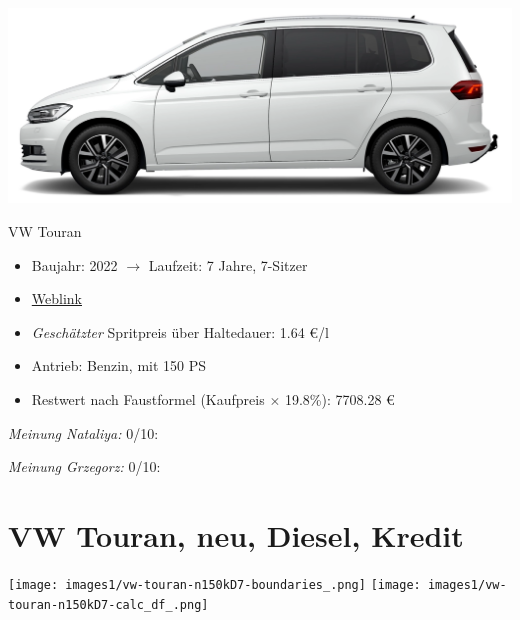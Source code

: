 \documentclass[landscape, DIV=99, 14pt]{scrartcl}
\begin{document}
\pagebreak
\begin{center}
\includegraphics[width=0.9\columnwidth]{cars/vw-touran-neu-benzin.png}

VW Touran
\end{center}

\begin{itemize}
    \item Baujahr: 2022 $\rightarrow$ Laufzeit: 7 Jahre, 7-Sitzer
    \item \href{https://www.volkswagen.de/de/konfigurator.html/__app/touran/touran/highline.app?buildabilityStatus-app=buildable&category-app=private&carlineId-app=31000&salesGroupId-app=32600&trimName-app=Highline&modelId-app=5T14PZ%24GYORYOR&modelVersion-app=2&modelYear-app=2022&exteriorId-app=F14+0Q0Q&interiorId-app=F56+++++BG&options-app=GWBGWBG-GPG3PG3-MAHV1M6-GPF9PF9-GRBDRBD-MKSUKA1-MSSH4KF-GP19P19-MVTV9IJ-GWQ1WQ1}{Weblink}
    \item \emph{Gesch\"atzter} Spritpreis \"uber Haltedauer: 1.64 \euro{}/l
    \item Antrieb: Benzin, mit 150 PS
    \item Restwert nach Faustformel (Kaufpreis $\times$ 19.8\%): 7708.28 \euro{}
\end{itemize}

\begin{small}
\emph{Meinung Nataliya:} 0/10: 
        
\emph{Meinung Grzegorz:} 0/10: 
\end{small}

\pagebreak


\twocolumn

\section*{VW Touran, neu, Diesel, Kredit}
\begin{center}
\texttt{[image: images1/vw-touran-n150kD7-boundaries\_.png]}
\null
\vspace{0.5cm}
\texttt{[image: images1/vw-touran-n150kD7-calc\_df\_.png]}
\end{center}
\end{document}
